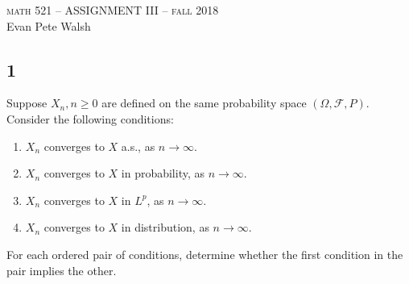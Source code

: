 \documentclass[12pt]{article}
\newcommand\toinf{\rightarrow\infty}
\begin{document}
\thispagestyle{empty}
\begin{center}
  \Large \textsc{math 521 -- ASSIGNMENT III -- fall 2018} \\ 
  \vspace{5mm}
  \large Evan Pete Walsh
\end{center}


\subsection*{1}
\begin{tcolorbox}
  Suppose $X_n, n\geq 0$ are defined on the same probability space $(\Omega, \mathcal{F}, P)$. Consider the following conditions:
  \begin{enumerate}[label=(\roman*)]
    \item $X_n$ converges to $X$ a.s., as $n \rightarrow \infty$.
    \item $X_n$ converges to $X$ in probability, as $n \toinf$.
    \item $X_n$ converges to $X$ in $L^p$, as $n \toinf$.
    \item $X_n$ converges to $X$ in distribution, as $n \toinf$.
  \end{enumerate}
  For each ordered pair of conditions, determine whether the first condition in the pair implies the other.
\end{tcolorbox}
\end{document}
